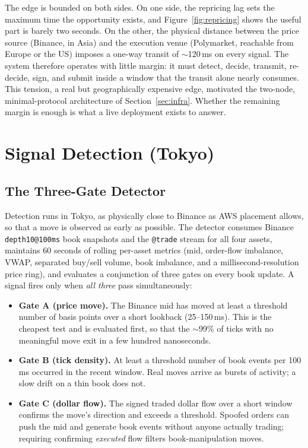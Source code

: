 \documentclass{tmsce}
\let\oldsection\section
\renewcommand{\section}{\clearpage\oldsection}
\begin{document}
The edge is bounded on both sides. On one side, the repricing lag sets the maximum
time the opportunity exists, and Figure~\ref{fig:repricing} shows the useful part is
barely two seconds. On the other, the physical distance between the price source
(Binance, in Asia) and the execution venue (Polymarket, reachable from Europe or the
US) imposes a one-way transit of $\sim$120\,ms on every signal. The system
therefore operates with little margin: it must detect, decide, transmit, re-decide,
sign, and submit inside a window that the transit alone nearly consumes. This
tension, a real but geographically expensive edge, motivated the two-node,
minimal-protocol architecture of Section~\ref{sec:infra}. Whether the remaining
margin is enough is what a live deployment exists to answer.


\section{Signal Detection (Tokyo)}
\label{sec:detection}

\subsection{The Three-Gate Detector}

Detection runs in Tokyo, as physically close to Binance as AWS placement allows, so
that a move is observed as early as possible. The detector consumes Binance
\texttt{depth10@100ms} book snapshots and the \texttt{@trade} stream for all four
assets, maintains 60 seconds of rolling per-asset metrics (mid, order-flow
imbalance, VWAP, separated buy/sell volume, book imbalance, and a
millisecond-resolution price ring), and evaluates a conjunction of three gates on
every book update. A signal fires only when \emph{all three} pass simultaneously:

\begin{itemize}
  \item \textbf{Gate A (price move).} The Binance mid has moved at least a threshold
        number of basis points over a short lookback (25--150\,ms). This is the
        cheapest test and is evaluated first, so that the $\sim$99\% of ticks with no
        meaningful move exit in a few hundred nanoseconds.
  \item \textbf{Gate B (tick density).} At least a threshold number of book events
        per 100\,ms occurred in the recent window. Real moves arrive as bursts of
        activity; a slow drift on a thin book does not.
  \item \textbf{Gate C (dollar flow).} The signed traded dollar flow over a short
        window confirms the move's direction and exceeds a threshold. Spoofed orders
        can push the mid and generate book events without anyone actually trading;
        requiring confirming \emph{executed} flow filters book-manipulation moves.
\end{itemize}
\end{document}
